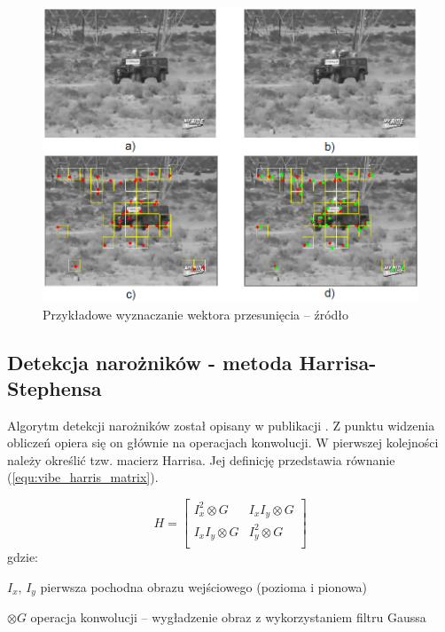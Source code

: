 	\begin{figure}[h]
		\centering
		\includegraphics[scale=0.65]{img/3/of_example.png}
		\caption{Przykładowe wyznaczanie wektora przesunięcia -- źródło \cite{kryjak_14_vibe}}
		\label{fig:vibe_of_example}
	\end{figure}

\subsection{Detekcja narożników - metoda Harrisa-Stephensa}
\label{subsec:vibe_harris}

Algorytm detekcji narożników został opisany w publikacji \cite{harris_88}. 
Z punktu widzenia obliczeń opiera się on głównie na operacjach konwolucji. 
W pierwszej kolejności należy określić tzw. macierz Harrisa. 
Jej definicję przedstawia równanie (\ref{equ:vibe_harris_matrix}).

    \begin{equation}
        H = \begin{bmatrix}
               I_x^2 \otimes G    & I_x I_y \otimes G  \\
               I_x I_y \otimes G  & I_y^2 \otimes G    \\
     \end{bmatrix}
        \label{equ:vibe_harris_matrix}
    \end{equation}
gdzie:
\begin{eqwhere}[2cm]
	\item[$I_x,\, I_y$] pierwsza pochodna obrazu wejściowego (pozioma i pionowa)
	\item[$\otimes G$] operacja konwolucji -- wygładzenie obraz z wykorzystaniem filtru Gaussa
\end{eqwhere}

